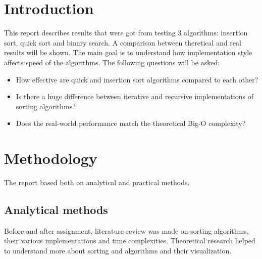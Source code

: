 \documentclass{article}
\begin{document}
\newpage
\section{Introduction}
This report describes results that were got from testing 3 algorithms: insertion sort, quick sort and binary search. A comparison between theretical and real results will be shown. The main goal is to understand how implementation style affects speed of the algorithms.
The following questions will be asked:
\begin{itemize}
    \item How effective are quick and insertion sort algorithms compared to each other?
    \item Is there a huge difference between iterative and recursive implementations of sorting algorithms?
    \item Does the real-world performance match the theoretical Big-O complexity?
\end{itemize}

\section{Methodology}
The report based both on analytical and practical methods.

\subsection{Analytical methods}
Before and after assignment, literature review was made on sorting algorithms, their various implementations and time complexities. Theoretical research helped to understand more about sorting and algorithms and their visualization. 
\end{document}
